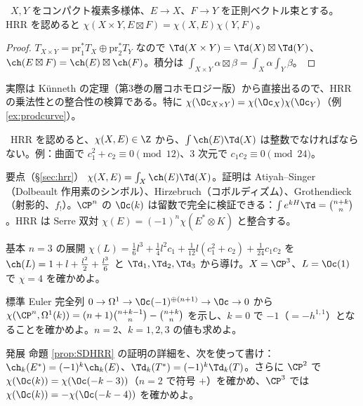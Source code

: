 \begin{prop}[積と Künneth]\label{prop:product}\tP\
$X,Y$ をコンパクト複素多様体、$E\to X$、$F\to Y$ を正則ベクトル束とする。HRR を認めると $\chi(X\times Y,E\boxtimes F)=\chi(X,E)\chi(Y,F)$。
\end{prop}
\begin{proof}
$T_{X\times Y}=\mathrm{pr}_1^*T_X\oplus\mathrm{pr}_2^*T_Y$ なので $\Td(X\times Y)=\Td(X)\boxtimes\Td(Y)$、$\ch(E\boxtimes F)=\ch(E)\boxtimes\ch(F)$。積分は $\int_{X\times Y}\alpha\boxtimes\beta=\int_X\alpha\int_Y\beta$。\qedhere
\end{proof}
\noindent 実際は Künneth の定理（第3巻の層コホモロジー版）から直接出るので、HRR の乗法性との整合性の検算である。特に $\chi(\Oc_{X\times Y})=\chi(\Oc_X)\chi(\Oc_Y)$（例 \ref{ex:prodcurve}）。
\begin{prop}[Noether 型の整数性]\label{prop:integral}\tP\ HRR を認めると、$\chi(X,E)\in\Z$ から、$\int\ch(E)\Td(X)$ は整数でなければならない。例：曲面で $c_1^2+c_2\equiv0\pmod{12}$、3 次元で $c_1c_2\equiv0\pmod{24}$。
\end{prop}
\begin{keybox}{要点（\S\ref{sec:hrr}）}
$\chi(X,E)=\int_X\ch(E)\Td(X)$。証明は Atiyah--Singer（Dolbeault 作用素のシンボル）、Hirzebruch（コボルディズム）、Grothendieck（射影的、$f_!$）。$\CP^n$ の $\Oc(k)$ は留数で完全に検証できる：$\int e^{kH}\Td=\binom{n+k}n$。HRR は Serre 双対 $\chi(E)=(-1)^n\chi(E^*\otimes K)$ と整合する。
\end{keybox}
\begin{prob}{基本}\label{p:hrrexp}
$n=3$ の展開 $\chi(L)=\frac16l^3+\frac14l^2c_1+\frac1{12}l(c_1^2+c_2)+\frac1{24}c_1c_2$ を $\ch(L)=1+l+\frac{l^2}2+\frac{l^3}6$ と $\Td_1,\Td_2,\Td_3$ から導け。$X=\CP^3$、$L=\Oc(1)$ で $\chi=4$ を確かめよ。
\end{prob}
\begin{prob}{標準}\label{p:Omegak}
Euler 完全列 $0\to\Omega^1\to\Oc(-1)^{\oplus(n+1)}\to\Oc\to0$ から $\chi(\CP^n,\Omega^1(k))=(n+1)\binom{n+k-1}n-\binom{n+k}n$ を示し、$k=0$ で $-1$（$=-h^{1,1}$）となることを確かめよ。$n=2$、$k=1,2,3$ の値も求めよ。
\end{prob}
\begin{prob}{発展}\label{p:SDHRR}
命題 \ref{prop:SDHRR} の証明の詳細を、次を使って書け：$\ch_k(E^*)=(-1)^k\ch_k(E)$、$\Td_k(T^*)=(-1)^k\Td_k(T)$。さらに $\CP^2$ で $\chi(\Oc(k))=\chi(\Oc(-k-3))$（$n=2$ で符号 $+$）を確かめ、$\CP^3$ では $\chi(\Oc(k))=-\chi(\Oc(-k-4))$ を確かめよ。
\end{prob}

